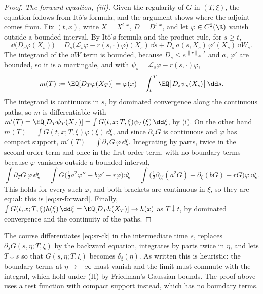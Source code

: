 \begin{proof}
\emph{The forward equation, (iii).} Given the regularity of $G$ in $(T,\xi)$, the equation follows from It\^o's
formula, and the argument shows where the adjoint comes from. Fix $(t,x)$, write $X=X^{t,x}$, $D=D^{t,x}$, and
let $\varphi\in C^2(\R)$
vanish outside a bounded interval. By It\^o's formula and the product rule, for $s\ge t$,
\[
  \dd\big(D_s\varphi(X_s)\big)=D_s\big(\mathcal L_s\varphi-r(s,\cdot)\varphi\big)(X_s)\,\dd s+D_s\,a(s,X_s)\,\varphi'(X_s)\,\dd W_s .
\]
The integrand of the $\dd W$ term is bounded, because $D_s\le e^{\|r\|_\infty\bar T}$ and $a$, $\varphi'$ are bounded,
so it is a martingale, and with $\psi_s=\mathcal L_s\varphi-r(s,\cdot)\varphi$,
\[
  m(T):=\EQ[D_T\varphi(X_T)]=\varphi(x)+\int_t^T\EQ\big[D_s\psi_s(X_s)\big]\,\dd s .
\]
The integrand is continuous in $s$, by dominated convergence along the continuous paths, so $m$ is
differentiable with $m'(T)=\EQ[D_T\psi_T(X_T)]=\int G(t,x;T,\xi)\psi_T(\xi)\,\dd\xi$, by (i). On the other hand
$m(T)=\int G(t,x;T,\xi)\varphi(\xi)\,\dd\xi$, and since $\partial_TG$ is continuous and $\varphi$ has compact support,
$m'(T)=\int\partial_TG\,\varphi\,\dd\xi$. Integrating by parts, twice in the second-order term and once in the
first-order term, with no boundary terms because $\varphi$ vanishes outside a bounded interval,
\[
  \int\partial_TG\,\varphi\,\dd\xi=\int G\Big(\tfrac12a^2\varphi''+b\varphi'-r\varphi\Big)\dd\xi
  =\int\Big(\tfrac12\partial_{\xi\xi}(a^2G)-\partial_\xi(bG)-rG\Big)\varphi\,\dd\xi .
\]
This holds for every such $\varphi$, and both brackets are continuous in $\xi$, so they are equal: this is
\eqref{eq:sr-forward}. Finally, $\int G(t,x;T,\xi)h(\xi)\,\dd\xi=\EQ[D_Th(X_T)]\to h(x)$ as $T\downarrow t$, by
dominated convergence and the continuity of the paths.
\end{proof}

\begin{remark}\label{rem:sr-ck-derivation}
The course differentiates \eqref{eq:sr-ck} in the intermediate time $s$, replaces $\partial_sG(s,\eta;T,\xi)$ by the
backward equation, integrates by parts twice in $\eta$, and lets $T\downarrow s$ so that $G(s,\eta;T,\xi)$ becomes
$\delta_\xi(\eta)$. As written this is heuristic: the boundary terms at $\eta\to\pm\infty$ must vanish and the limit
must commute with the integral, which hold under (H) by Friedman's Gaussian bounds. The proof above uses a
test function with compact support instead, which has no boundary terms.
\end{remark}

